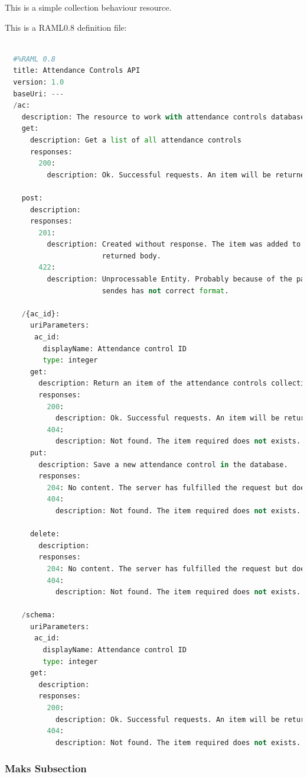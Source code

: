 This is a simple collection behaviour resource.

This is a RAML0.8 definition file:

\begin{lstlisting}[language=python,frame=none]

  #%RAML 0.8
  title: Attendance Controls API
  version: 1.0
  baseUri: ---
  /ac:
    description: The resource to work with attendance controls database saved-
    get:
      description: Get a list of all attendance controls
      responses:
        200:
          description: Ok. Successful requests. An item will be returned.

    post:
      description:
      responses:
        201:
          description: Created without response. The item was added to database will not
                       returned body.
        422:
          description: Unprocessable Entity. Probably because of the payload
                       sendes has not correct format.

    /{ac_id}:
      uriParameters:
       ac_id:
         displayName: Attendance control ID
         type: integer
      get:
        description: Return an item of the attendance controls collection.
        responses:
          200:
            description: Ok. Successful requests. An item will be returned.
          404:
            description: Not found. The item required does not exists.
      put:
        description: Save a new attendance control in the database.
        responses:
          204: No content. The server has fulfilled the request but does not need to return an entity-body.
          404:
            description: Not found. The item required does not exists.

      delete:
        description:
        responses:
          204: No content. The server has fulfilled the request but does not need to return an entity-body.
          404:
            description: Not found. The item required does not exists.

    /schema:
      uriParameters:
       ac_id:
         displayName: Attendance control ID
         type: integer
      get:
        description:
        responses:
          200:
            description: Ok. Successful requests. An item will be returned.
          404:
            description: Not found. The item required does not exists.

\end{lstlisting}

\subsubsection{Maks Subsection}

